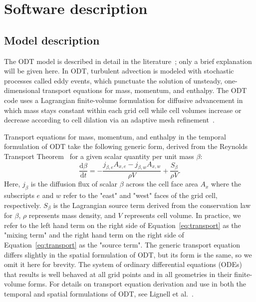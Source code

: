 \documentclass[preprint,12pt, a4paper]{elsarticle}
\begin{document}
\section{Software description}
\label{sec:description}

\subsection{Model description}
\label{sub:model_description}

The ODT model is described in detail in the literature~\cite{Kerstein_1999,Kerstein_2001,Ashurst_2005,Lignell_2018,Lignell_2013}; only a brief explanation will be given here. In ODT, turbulent advection is modeled with stochastic processes called eddy events, which punctuate the solution of unsteady, one-dimensional transport equations for mass, momentum, and enthalpy. The ODT code uses a Lagrangian finite-volume formulation for diffusive advancement in which mass stays constant within each grid cell while cell volumes increase or decrease according to cell dilation via an adaptive mesh refinement~\cite{Lignell_2013}.

Transport equations for mass, momentum, and enthalpy in the temporal formulation of ODT take the following generic form, derived from the Reynolds Transport Theorem~\cite{Cengel_2010} for a given scalar quantity per unit mass $\beta$: 
\begin{equation} 
\label{eq:transport}
	\frac{\mathrm{d}\beta}{\mathrm{d}t} = -\frac{j_{\beta,e}A_{x,e}-j_{\beta,w}A_{x,w}}{\rho V} + \frac{S_{\beta}}{\rho V}.
\end{equation}
Here, $j_{\beta}$ is the diffusion flux of scalar $\beta$ across the cell face area $A_x$ where the subscripts $e$ and $w$ refer to the "east" and "west" faces of the grid cell, respectively. $S_{\beta}$ is the Lagrangian source term derived from the conservation law for $\beta$, $\rho$ represents mass density, and $V$ represents cell volume. In practice, we refer to the left hand term on the right side of Equation~\ref{eq:transport} as the "mixing term" and the right hand term on the right side of Equation~\ref{eq:transport} as the "source term". The generic transport equation differs slightly in the spatial formulation of ODT, but its form is the same, so we omit it here for brevity. The system of ordinary differential equations (ODEs) that results is well behaved at all grid points and in all geometries in their finite-volume forms. For details on transport equation derivation and use in both the temporal and spatial formulations of ODT, see Lignell et al.~\cite{Lignell_2018}. 
\end{document}
